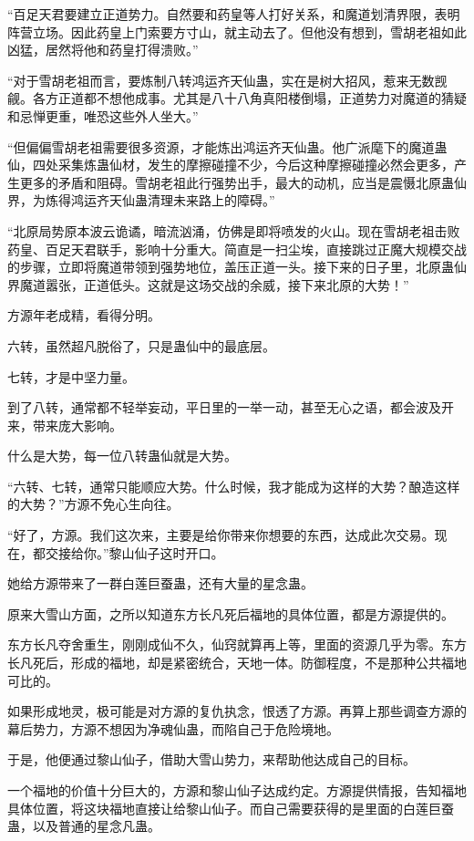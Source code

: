 \begin{this_body}
“百足天君要建立正道势力。自然要和药皇等人打好关系，和魔道划清界限，表明阵营立场。因此药皇上门索要方寸山，就主动去了。但他没有想到，雪胡老祖如此凶猛，居然将他和药皇打得溃败。”

“对于雪胡老祖而言，要炼制八转鸿运齐天仙蛊，实在是树大招风，惹来无数觊觎。各方正道都不想他成事。尤其是八十八角真阳楼倒塌，正道势力对魔道的猜疑和忌惮更重，唯恐这些外人坐大。”

“但偏偏雪胡老祖需要很多资源，才能炼出鸿运齐天仙蛊。他广派麾下的魔道蛊仙，四处采集炼蛊仙材，发生的摩擦碰撞不少，今后这种摩擦碰撞必然会更多，产生更多的矛盾和阻碍。雪胡老祖此行强势出手，最大的动机，应当是震慑北原蛊仙界，为炼得鸿运齐天仙蛊清理未来路上的障碍。”

“北原局势原本波云诡谲，暗流汹涌，仿佛是即将喷发的火山。现在雪胡老祖击败药皇、百足天君联手，影响十分重大。简直是一扫尘埃，直接跳过正魔大规模交战的步骤，立即将魔道带领到强势地位，盖压正道一头。接下来的日子里，北原蛊仙界魔道嚣张，正道低头。这就是这场交战的余威，接下来北原的大势！”

方源年老成精，看得分明。

六转，虽然超凡脱俗了，只是蛊仙中的最底层。

七转，才是中坚力量。

到了八转，通常都不轻举妄动，平日里的一举一动，甚至无心之语，都会波及开来，带来庞大影响。

什么是大势，每一位八转蛊仙就是大势。

“六转、七转，通常只能顺应大势。什么时候，我才能成为这样的大势？酿造这样的大势？”方源不免心生向往。

“好了，方源。我们这次来，主要是给你带来你想要的东西，达成此次交易。现在，都交接给你。”黎山仙子这时开口。

她给方源带来了一群白莲巨蚕蛊，还有大量的星念蛊。

原来大雪山方面，之所以知道东方长凡死后福地的具体位置，都是方源提供的。

东方长凡夺舍重生，刚刚成仙不久，仙窍就算再上等，里面的资源几乎为零。东方长凡死后，形成的福地，却是紧密统合，天地一体。防御程度，不是那种公共福地可比的。

如果形成地灵，极可能是对方源的复仇执念，恨透了方源。再算上那些调查方源的幕后势力，方源不想因为净魂仙蛊，而陷自己于危险境地。

于是，他便通过黎山仙子，借助大雪山势力，来帮助他达成自己的目标。

一个福地的价值十分巨大的，方源和黎山仙子达成约定。方源提供情报，告知福地具体位置，将这块福地直接让给黎山仙子。而自己需要获得的是里面的白莲巨蚕蛊，以及普通的星念凡蛊。


\end{this_body}
